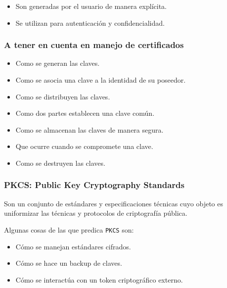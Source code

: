 \begin{itemize}
	\item Son generadas por el usuario de manera explícita.
	\item Se utilizan para autenticación y confidencialidad.
\end{itemize}

\subsubsection{A tener en cuenta en manejo de certificados}
\begin{itemize}
	\item Como se generan las claves.
	\item Como se asocia una clave a la identidad de su poseedor.
	\item Como se distribuyen las claves.
	\item Como dos partes establecen una clave común.
	\item Como se almacenan las claves de manera segura.
	\item Que ocurre cuando se compromete una clave.
	\item Como se destruyen las claves.
\end{itemize}

\subsubsection{PKCS: Public Key Cryptography Standards}
Son un conjunto de estándares y especificaciones técnicas cuyo objeto es uniformizar las técnicas y protocolos de criptografía pública. 

Algunas cosas de las que predica \texttt{PKCS} son:
\begin{itemize}
	\item Cómo se manejan estándares cifrados.
	\item Cómo se hace un backup de claves.
	\item Cómo se interactúa con un token criptográfico externo.
\end{itemize}


